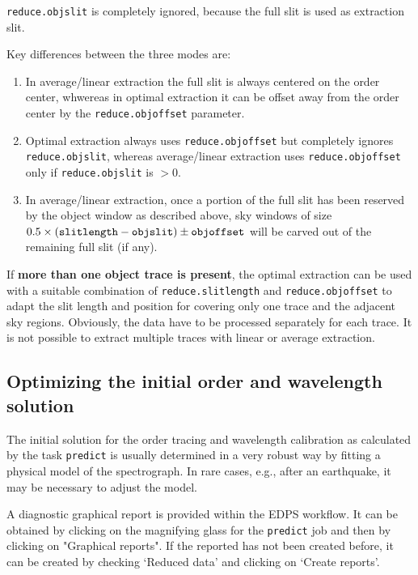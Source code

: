 {\tt reduce.objslit} is completely ignored, because the full slit is used as extraction slit.

Key differences between the three modes are:
\begin{enumerate}
    \item In average/linear extraction the full slit is always centered on the order center, 
    whwereas in optimal extraction it can be offset away from the order center by the 
    {\tt reduce.objoffset} parameter.
    \item Optimal extraction always uses {\tt reduce.objoffset}  but completely ignores 
    {\tt reduce.objslit},
    whereas average/linear extraction uses {\tt reduce.objoffset} only if {\tt reduce.objslit} is $>0$.
    \item In average/linear extraction, once a portion of the full slit has been reserved by 
    the object window as described above, sky windows of size 
    $0.5 \times ({\tt slitlength} - {\tt objslit}) \pm {\tt objoffset}$\newline
    will be carved out of the remaining full slit (if any).
\end{enumerate}

If \textbf{more than one object trace is present},
the optimal extraction can be used with a suitable combination
of {\tt reduce.slitlength} and {\tt reduce.objoffset} to adapt the slit length and position
for covering only one trace and the adjacent sky regions. 
Obviously, the data have to be processed separately for each trace. It is not
possible to extract multiple traces with linear or average extraction.

\subsection{Optimizing the initial order and wavelength solution}
\label{sec:initial-guess}

The initial solution for the order tracing and wavelength calibration as calculated by the task
{\tt predict} is usually determined in a very robust way by fitting a physical model of the
spectrograph. In rare cases, e.g., after an earthquake, it may be necessary to adjust the model.

A diagnostic graphical report is provided within the EDPS workflow. It can be obtained by clicking
on the magnifying glass for the {\tt predict} job and then by clicking on "Graphical reports".
If the reported has not been created before, it can be created by checking `Reduced data' and
clicking on `Create reports'.

